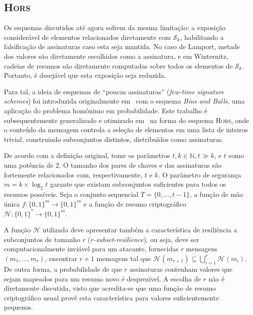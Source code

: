 \documentclass[12pt,notitlepage]{report}
\newcommand{\hh}{\mathcal{H}}
\newcommand{\sk}{\mathcal{S}_k}
\newcommand{\hash}[2][]{\mathcal{H}^{#1}(#2)}
\newcommand{\binwds}[1]{\{0, 1\}^{#1}}
\newcommand{\fhash}[1]{\hh{} : \binwds{*} \longrightarrow \binwds{#1}}
\newcommand{\hors}{\textsc{Hors}}
\begin{document}
\subsection{\hors{}}
\label{subsection:hors}

Os esquemas discutidos até agora sofrem da mesma limitação: a exposição
considerável de elementos relacionados diretamente com $\sk{}$, habilitando
a falsificação de assinaturas caso esta seja mantida. No caso de Lamport, metade
dos valores são diretamente escolhidos como a assinatura, e em Winternitz,
cadeias de resumos são diretamente computadas sobre todos os elementos de $\sk{}$. Portanto,
é desejável que esta exposição seja reduzida.

Para tal, a ideia de esquemas de ``poucas assinaturas'' (\emph{few-time signature
schemes}) foi introduzida originalmente em~\cite{Perrig:2001:BOS:501983.501988}
com o esquema \emph{Bins and Balls}, uma aplicação do problema homônimo em
probabilidade. Este trabalho é subsequentemente generalizado e otimizado
em~\cite{Reyzin:2002:BBS:646039.678322} na forma do esquema \hors{},
onde o conteúdo da mensagem controla a
seleção de elementos em uma lista de inteiros trivial, construindo subconjuntos
distintos, distribuídos como assinaturas.

De acordo com a definição original, tome
os parâmetros $t, k \in \mathbb{N}, t \gg k$, e $t$ como uma potência de 2.
O tamanho dos pares de chaves e das assinaturas são fortemente relacionados
com, respectivamente, $t$ e $k$. O parâmetro de segurança
$m = k \times \log_2 t$ garante que existam subconjuntos suficientes para
todos os resumos possíveis. Seja o conjunto sequencial $T = \{0, \dots, t - 1\}$, a função de mão única $f : \binwds{m} \longrightarrow \binwds{m}$ e a função de resumo criptográfico $\fhash{m}$.

A função $\hh{}$ utilizada deve apresentar também a característica de
resiliência a subconjuntos de tamanho $r$ (\emph{$r$-subset-resilience}), ou seja, deve ser computacionalmente inviável
para um atacante, fornecidas $r$ mensagens $(m_1, \dots, m_r)$, encontrar
$r + 1$ mensagens tal que $\hash{m_{r + 1}} \subseteq \bigcup^{r}_{i = 1} \hash{m_i}$. De outra forma, a probabilidade de que $r$ assinaturas contenham valores que sejam mapeados para um resumo novo é desprezível.
A escolha de $r$ não é diretamente discutida, visto que acredita-se que uma função de resumo criptográfico usual provê esta característica para valores suficientemente pequenos.
\end{document}
